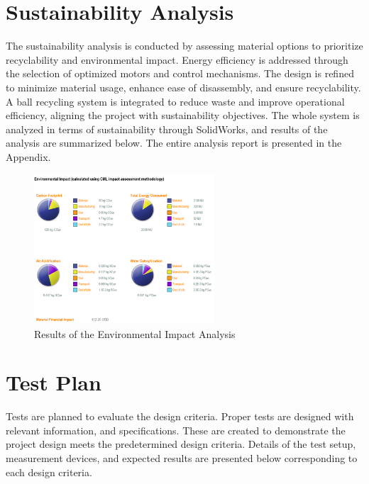 \documentclass[12pt]{article}
\begin{document}
\section{Sustainability Analysis}
The sustainability analysis is conducted by assessing material options to prioritize recyclability and environmental impact. Energy efficiency is addressed through the selection of optimized motors and control mechanisms. The design is refined to minimize material usage, enhance ease of disassembly, and ensure recyclability. A ball recycling system is integrated to reduce waste and improve operational efficiency, aligning the project with sustainability objectives. The whole system is analyzed in terms of sustainability through SolidWorks, and results of the analysis are summarized below. The entire analysis report is presented in the Appendix.

\begin{figure}[h]
    \centering
    \includegraphics[width=0.6\textwidth]{sustaibabilityanalysis.png}
    \caption{Results of the Environmental Impact Analysis}
    \label{fig:sustainabilityanalysis}
\end{figure}

\newpage

\section{Test Plan}
Tests are planned to evaluate the design criteria. Proper tests are designed with relevant information, and specifications. These are created to demonstrate the project design meets the predetermined design criteria. Details of the test setup, measurement devices, and expected results are presented below corresponding to each design criteria.
\end{document}

